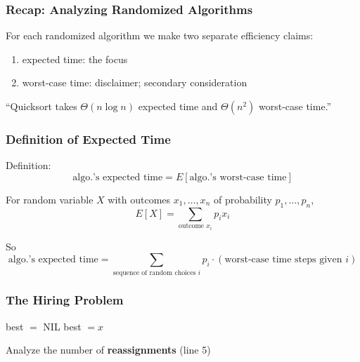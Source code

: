 \documentclass[10pt]{beamer}
\begin{document}
\begin{frame} \frametitle{Recap: Analyzing Randomized Algorithms}
  For each randomized algorithm we make two separate efficiency claims:
  \begin{enumerate}
    \item expected time: the focus
    \item worst-case time: disclaimer; secondary consideration
  \end{enumerate}
  \vspace{12pt}

  ``Quicksort takes $\Theta(n \log n)$ expected time and $\Theta(n^2)$ worst-case time.''
\end{frame}

\begin{frame} \frametitle{Definition of Expected Time}
  Definition: 
  \[ \text{algo.'s expected time} = E[\text{algo.'s worst-case time}] \]

  For random variable $X$ with outcomes $x_1, \ldots, x_n$ of probability $p_1, \ldots, p_n$,
  \[ E[X] = \sum_{\text{outcome $x_i$}} p_i x_i \]

  So
  \[ \text{algo.'s expected time} = \sum_{\text{sequence of random choices $i$}} p_i \cdot (\text{worst-case time steps given } i) \]

\end{frame}

\begin{frame} \frametitle{The Hiring Problem}
  {\footnotesize
  \begin{algorithmic}[1]
    \State best $ = $ NIL
        \State best $= x$
      \EndIf
    \EndFor
    \State {}
    \EndFunction
  \end{algorithmic}
  }
  \vspace{24pt}

  Analyze the number of \textbf{reassignments} (line 5)
\end{frame}
\end{document}
